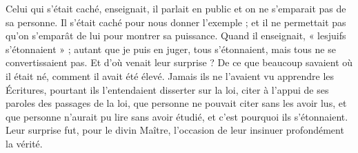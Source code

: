 Celui qui s’était caché, enseignait, il parlait en public et on ne s’emparait pas de sa personne. Il s’était caché pour nous donner l’exemple ; et il ne permettait pas qu’on s’emparât de lui pour montrer sa puissance. Quand il enseignait, « lesjuifs s’étonnaient » ; autant que je puis en juger, tous s’étonnaient, mais tous ne se convertissaient pas. Et d’où venait leur surprise ? De ce que beaucoup savaient où il était né, comment il avait été élevé. Jamais ils ne l’avaient vu apprendre les Écritures, pourtant ils l’entendaient disserter sur la loi, citer à l’appui de ses paroles des passages de la loi, que personne ne pouvait citer sans les avoir lus, et que personne n’aurait pu lire sans avoir étudié, et c’est pourquoi ils s’étonnaient. Leur surprise fut, pour le divin Maître, l’occasion de leur insinuer profondément la vérité.
